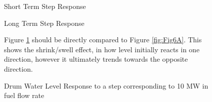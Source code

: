         \begin{figure}[ht]
            \begin{center}
                
                Short Term Step Response
                
                
                Long Term Step Response
                
                \caption{Drum Water Level Response to a step corresponding to 10 MW in fuel flow rate}
                \label{fig:Valve_Open1A}
            \end{center}
            Figure \ref{fig:Valve_Open1A} should be directly compared to Figure \ref{fig:Fig6A}. This shows the shrink/swell effect, in how level initially reacts in one direction, however it ultimately trends towards the opposite direction.
        \end{figure}  %
        
